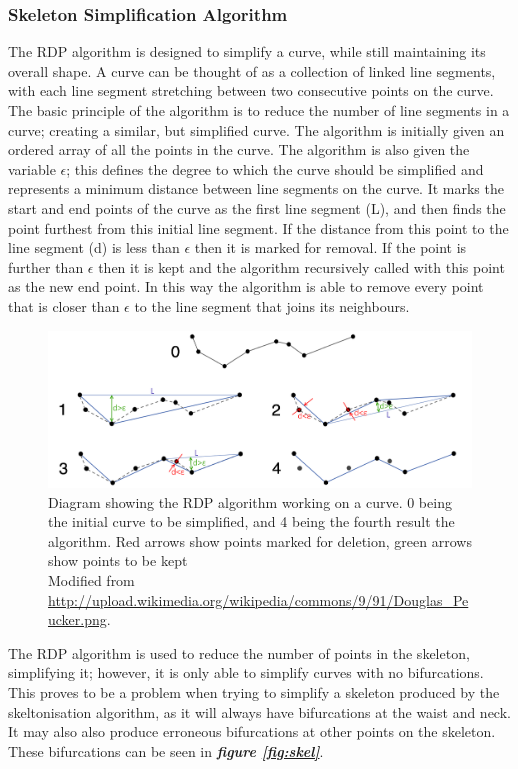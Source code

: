 \documentclass[a4paper, 12pt]{article}
\begin{document}
		\subsubsection{Skeleton Simplification Algorithm}
	The RDP algorithm is designed to simplify a curve, while still maintaining its overall shape. A curve can be thought of as a collection of linked line segments, with each line segment stretching between two consecutive points on the curve. The basic principle of the algorithm is to reduce the number of line segments in a curve; creating a similar, but simplified curve. The algorithm is initially given an ordered array of all the points in the curve. The algorithm is also given the variable $\epsilon$; this defines the degree to which the curve should be simplified and represents a minimum distance between line segments on the curve. It marks the start and end points of the curve as the first line segment (L), and then finds the point furthest from this initial line segment. If the distance from this point to the line segment (d) is less than $\epsilon$ then it is marked for removal. If the point is further than $\epsilon$ then it is kept and the algorithm recursively called with this point as the new end point. In this way the algorithm is able to remove every point that is closer than $\epsilon$ to the line segment that joins its neighbours.
%
\begin{figure}[H]
	\centering
  	\includegraphics[width=\textwidth]{douglas_peucker.png}
  	\caption{Diagram showing the RDP algorithm working on a curve. 0 being the initial curve to be simplified, and 4 being the fourth result the algorithm. Red arrows show points marked for deletion, green arrows show points to be kept\\
  	Modified from \url{http://upload.wikimedia.org/wikipedia/commons/9/91/Douglas_Peucker.png}.}
  	\label{fig:douglas_peucker}
\end{figure}
%
\noindent The RDP algorithm is used to reduce the number of points in the skeleton, simplifying it; however, it is only able to simplify curves with no bifurcations. This proves to be a problem when trying to simplify a skeleton produced by the skeltonisation algorithm, as it will always have bifurcations at the waist and neck. It may also also produce erroneous bifurcations at other points on the skeleton. These bifurcations can be seen in \textbf{\emph{figure \ref{fig:skel}}}.\\
\end{document}
